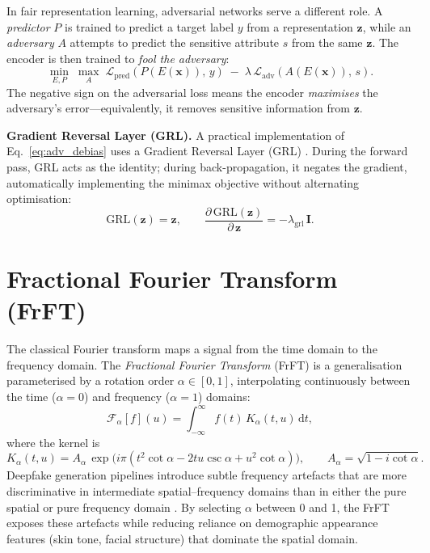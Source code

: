 In fair representation learning, adversarial networks serve a
different role.  A \emph{predictor} $P$ is trained to predict
a target label $y$ from a representation $\mathbf{z}$, while an
\emph{adversary} $A$ attempts to predict the sensitive attribute
$s$ from the same $\mathbf{z}$.  The encoder is then trained to
\emph{fool the adversary}:
\begin{equation}
  \min_{E,P}\;\max_{A}\;
  \mathcal{L}_{\mathrm{pred}}(P(E(\mathbf{x})),\, y)
  \;-\; \lambda\,\mathcal{L}_{\mathrm{adv}}(A(E(\mathbf{x})),\, s).
  \label{eq:adv_debias}
\end{equation}
The negative sign on the adversarial loss means the encoder
\emph{maximises} the adversary's error—equivalently, it removes
sensitive information from $\mathbf{z}$.

\noindent\textbf{Gradient Reversal Layer (GRL).}
A practical implementation of Eq.~\ref{eq:adv_debias} uses a
Gradient Reversal Layer (GRL) \cite{ganin2016}.  During
the forward pass, GRL acts as the identity; during
back-propagation, it negates the gradient, automatically
implementing the minimax objective without alternating optimisation:
\begin{equation}
  \mathrm{GRL}(\mathbf{z}) = \mathbf{z}, \qquad
  \frac{\partial\,\mathrm{GRL}(\mathbf{z})}{\partial\,\mathbf{z}}
  = -\lambda_{\mathrm{grl}}\,\mathbf{I}.
  \label{eq:grl}
\end{equation}

\section{Fractional Fourier Transform (FrFT)}
\label{sec:frft}

The classical Fourier transform maps a signal from the time domain
to the frequency domain.  The \emph{Fractional Fourier Transform}
(FrFT) \cite{ozaktas2001} is a generalisation parameterised by a
rotation order $\alpha \in [0,1]$, interpolating continuously
between the time ($\alpha=0$) and frequency ($\alpha=1$) domains:
\begin{equation}
  \mathcal{F}_\alpha[f](u)
  = \int_{-\infty}^{\infty} f(t)\,K_\alpha(t,u)\,\mathrm{d}t,
  \label{eq:frft}
\end{equation}
where the kernel is
\[
  K_\alpha(t, u)
  = A_\alpha\,
    \exp\!\bigl(
      i\pi(t^2 \cot\alpha - 2tu\csc\alpha + u^2 \cot\alpha)
    \bigr), \qquad
  A_\alpha = \sqrt{1 - i\cot\alpha}.
\]
Deepfake generation pipelines introduce subtle frequency artefacts
that are more discriminative in intermediate spatial–frequency
domains than in either the pure spatial or pure frequency domain
\cite{liu2021}.  By selecting $\alpha$ between 0 and 1, the FrFT
exposes these artefacts while reducing reliance on demographic
appearance features (skin tone, facial structure) that dominate
the spatial domain.

